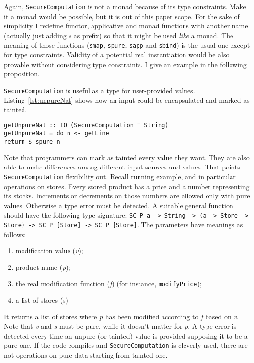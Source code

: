 Again, \texttt{SecureComputation} is not a monad because of its type constraints. Make it a monad would be possible, but it is out of this paper scope. For the sake of simplicity I redefine functor, applicative and monad functions with another name (actually just adding \textit{s} as prefix) so that it might be used \textit{like} a monad. The meaning of those functions (\texttt{smap}, \texttt{spure}, \texttt{sapp} and \texttt{sbind}) is the usual one except for type constraints. Validity of a potential real instantiation would be also provable without considering type constraints. I give an example in the following proposition.

\texttt{SecureComputation} is useful as a type for user-provided values. Listing~\ref{lst:unpureNat} shows how an input could be encapsulated and marked as tainted. 
\begin{lstlisting}[caption={Tainted natural number},label={lst:unpureNat}, breaklines=true]
getUnpureNat :: IO (SecureComputation T String)
getUnpureNat = do n <- getLine
return $ spure n
\end{lstlisting}
Note that programmers can mark as tainted every value they want. They are also able to make differences among different input sources and values. That points \texttt{SecureComputation} flexibility out. Recall running example, and in particular operations on stores. Every stored product has a price and a number representing its stocks. Increments or decrements on those numbers are allowed only with pure values. Otherwise a type error must be detected. A suitable general function should have the following type signature: \texttt{SC P a -> String -> (a -> Store -> Store) -> SC P [Store] -> SC P [Store]}. The parameters have meanings as follows:
\begin{enumerate}
	\item modification value (\textit{v});
	\item product name (\textit{p});
	\item the real modification function (\textit{f}) (for instance, \texttt{modifyPrice});
	\item a list of stores (s).
\end{enumerate}
It returns a list of stores where \textit{p} has been modified according to \textit{f} based on \textit{v}. Note that \textit{v} and \textit{s} must be pure, while it doesn't matter for \textit{p}. A type error is detected every time an unpure (or tainted) value is provided supposing it to be a pure one. If the code compiles and \texttt{SecureComputation} is cleverly used, there are not operations on pure data starting from tainted one. 